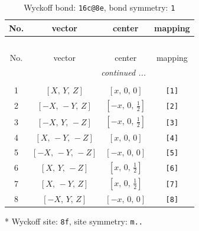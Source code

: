 \documentclass[fleqn,8pt]{jsarticle}
\begin{document}
\begin{longtable}{cccc}
\caption{Wyckoff bond: {\tt 16c@8e}, bond symmetry: {\tt 1}}
 \\
 \hline \hline
No. & vector & center & mapping \\ \hline \endfirsthead

\multicolumn{3}{l}{\tablename\ \thetable{}} \\
 \hline \hline
No. & vector & center & mapping \\ \hline \endhead

 \hline \hline
\multicolumn{3}{r}{\footnotesize\it continued ...} \\ \endfoot

 \hline \hline
\multicolumn{3}{r}{} \\ \endlastfoot

1 & $\left[ X,\, Y,\, Z \right]$ & $\left[ x,\, 0,\, 0 \right]$ & {\tt [1]} \\ \hline
2 & $\left[ - X,\, - Y,\, Z \right]$ & $\left[ - x,\, 0,\, \frac{1}{2} \right]$ & {\tt [2]} \\ \hline
3 & $\left[ - X,\, Y,\, - Z \right]$ & $\left[ - x,\, 0,\, \frac{1}{2} \right]$ & {\tt [3]} \\ \hline
4 & $\left[ X,\, - Y,\, - Z \right]$ & $\left[ x,\, 0,\, 0 \right]$ & {\tt [4]} \\ \hline
5 & $\left[ - X,\, - Y,\, - Z \right]$ & $\left[ - x,\, 0,\, 0 \right]$ & {\tt [5]} \\ \hline
6 & $\left[ X,\, Y,\, - Z \right]$ & $\left[ x,\, 0,\, \frac{1}{2} \right]$ & {\tt [6]} \\ \hline
7 & $\left[ X,\, - Y,\, Z \right]$ & $\left[ x,\, 0,\, \frac{1}{2} \right]$ & {\tt [7]} \\ \hline
8 & $\left[ - X,\, Y,\, Z \right]$ & $\left[ - x,\, 0,\, 0 \right]$ & {\tt [8]} \\
\end{longtable}
* Wyckoff site: {\tt 8f}, site symmetry: {\tt m..}
\renewcommand{\arraystretch}{1.2}
\end{document}
